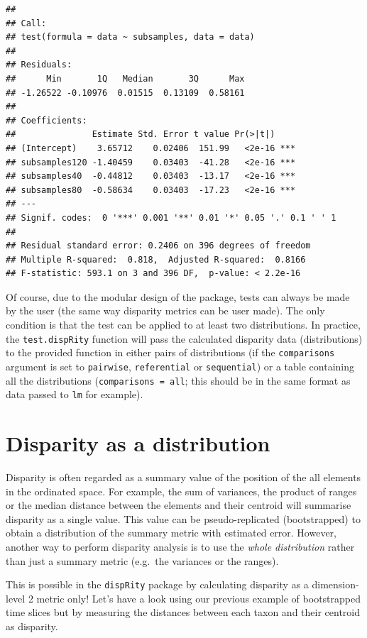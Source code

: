 \documentclass[]{book}
\theoremstyle{definition}
\theoremstyle{definition}
\theoremstyle{remark}
\begin{document}
\begin{verbatim}
## 
## Call:
## test(formula = data ~ subsamples, data = data)
## 
## Residuals:
##      Min       1Q   Median       3Q      Max 
## -1.26522 -0.10976  0.01515  0.13109  0.58161 
## 
## Coefficients:
##               Estimate Std. Error t value Pr(>|t|)    
## (Intercept)    3.65712    0.02406  151.99   <2e-16 ***
## subsamples120 -1.40459    0.03403  -41.28   <2e-16 ***
## subsamples40  -0.44812    0.03403  -13.17   <2e-16 ***
## subsamples80  -0.58634    0.03403  -17.23   <2e-16 ***
## ---
## Signif. codes:  0 '***' 0.001 '**' 0.01 '*' 0.05 '.' 0.1 ' ' 1
## 
## Residual standard error: 0.2406 on 396 degrees of freedom
## Multiple R-squared:  0.818,  Adjusted R-squared:  0.8166 
## F-statistic: 593.1 on 3 and 396 DF,  p-value: < 2.2e-16
\end{verbatim}

Of course, due to the modular design of the package, tests can always be
made by the user (the same way disparity metrics can be user made). The
only condition is that the test can be applied to at least two
distributions. In practice, the \texttt{test.dispRity} function will
pass the calculated disparity data (distributions) to the provided
function in either pairs of distributions (if the \texttt{comparisons}
argument is set to \texttt{pairwise}, \texttt{referential} or
\texttt{sequential}) or a table containing all the distributions
(\texttt{comparisons\ =\ all}; this should be in the same format as data
passed to \texttt{lm} for example).

\hypertarget{disparity-as-a-distribution}{\section{Disparity as a
distribution}\label{disparity-as-a-distribution}}

Disparity is often regarded as a summary value of the position of the
all elements in the ordinated space. For example, the sum of variances,
the product of ranges or the median distance between the elements and
their centroid will summarise disparity as a single value. This value
can be pseudo-replicated (bootstrapped) to obtain a distribution of the
summary metric with estimated error. However, another way to perform
disparity analysis is to use the \emph{whole distribution} rather than
just a summary metric (e.g.~the variances or the ranges).

This is possible in the \texttt{dispRity} package by calculating
disparity as a dimension-level 2 metric only! Let's have a look using
our previous example of bootstrapped time slices but by measuring the
distances between each taxon and their centroid as disparity.
\end{document}
